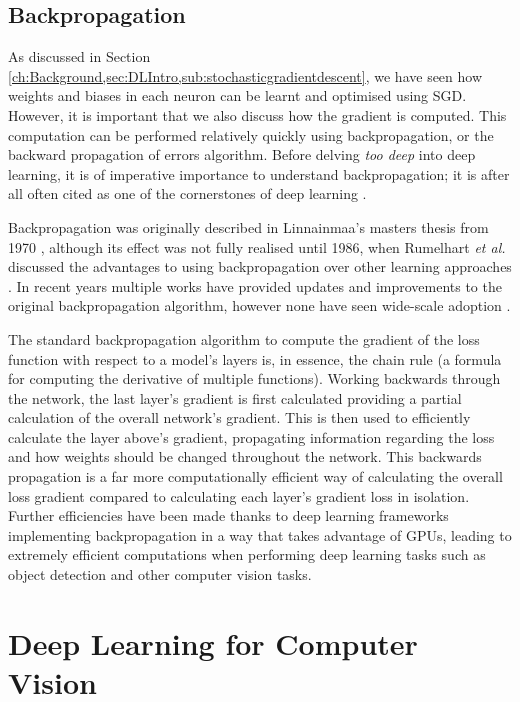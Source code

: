 \subsection{Backpropagation}\label{ch:Background,sec:DLIntro,sub:backprop}
As discussed in Section \ref{ch:Background,sec:DLIntro,sub:stochasticgradientdescent}, we have seen how weights and biases in each neuron can be learnt and optimised using SGD. However, it is important that we also discuss how the gradient is computed. This computation can be performed relatively quickly using backpropagation, or the backward propagation of errors algorithm. Before delving \textit{too deep} into deep learning, it is of imperative importance to understand backpropagation; it is after all often cited as one of the cornerstones of deep learning \cite{alber_backprop_2018}.

Backpropagation was originally described in Linnainmaa's masters thesis from 1970 \cite{linnainmaa_representation_1970}, although its effect was not fully realised until 1986, when Rumelhart \textit{et al.} discussed the advantages to using backpropagation over other learning approaches \cite{rumelhart_learning_1986}. In recent years multiple works have provided updates and improvements to the original backpropagation algorithm, however none have seen wide-scale adoption \cite{bengio_use_1994, lillicrap_random_2014, lee_difference_2015, nokland_direct_2016, liao_how_2016}. 

The standard backpropagation algorithm to compute the gradient of the loss function with respect to a model's layers is, in essence, the chain rule (a formula for computing the derivative of multiple functions). Working backwards through the network, the last layer's gradient is first calculated providing a partial calculation of the overall network's gradient. This is then used to efficiently calculate the layer above's gradient, propagating information regarding the loss and how weights should be changed throughout the network. This backwards propagation is a far more computationally efficient way of calculating the overall loss gradient compared to calculating each layer's gradient loss in isolation. Further efficiencies have been made thanks to deep learning frameworks implementing backpropagation in a way that takes advantage of GPUs, leading to extremely efficient computations when performing deep learning tasks such as object detection and other computer vision tasks.


\section{Deep Learning for Computer Vision}\label{ch:Background,sec:DLforCV}

